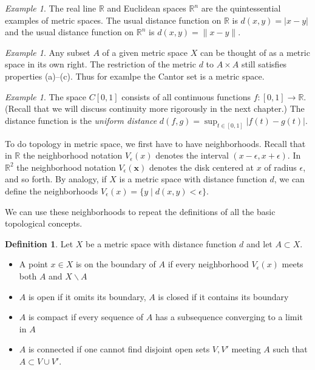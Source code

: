 \documentclass[11pt,oneside]{amsbook}
\newcommand{\RR}{\mathbb R}
\renewcommand{\setminus}{\smallsetminus}
\theoremstyle{definition}
\theoremstyle{plain}
\theoremstyle{definition}
\newtheorem{defn}[thm]{Definition}
\theoremstyle{remark}
\newtheorem{example}[thm]{Example}
\numberwithin{equation}{section}
\numberwithin{figure}{section}
\begin{document}
\begin{example}
  The real line $\RR$ and Euclidean spaces $\RR^n$ are the quintessential examples of metric spaces. The usual distance function on $\RR$ is $d(x,y)=|x-y|$ and the usual distance function on $\RR^n$ is $d(x,y)=\|x-y\|$.
\end{example}

\begin{example}
  Any subset $A$ of a given metric space $X$ can be thought of as a metric space in its own right. The restriction of the metric $d$ to $A\times A$ still satisfies properties (a)--(c). Thus for examlpe the Cantor set is a metric space.
\end{example}

\begin{example}
  The space $C[0,1]$ consists of all continuous functions $f\colon[0,1]\to\RR$. (Recall that we will discuss continuity more rigorously in the next chapter.) The distance function is the \emph{uniform distance} $d(f,g)=\sup_{t\in[0,1]}|f(t)-g(t)|$.
\end{example}

To do topology in metric space, we first have to have neighborhoods. Recall that in $\RR$ the neighborhood notation $V_\epsilon(x)$ denotes the interval $(x-\epsilon,x+\epsilon)$. In $\RR^2$ the neighborhood notation $V_\epsilon(\mathbf{x})$ denotes the disk centered at $x$ of radius $\epsilon$, and so forth. By analogy, if $X$ is a metric space with distance function $d$, we can define the neighborhoods $V_\epsilon(x)=\{y\mid d(x,y)<\epsilon\}$.

We can use these neighborhoods to repeat the definitions of all the basic topological concepts.

\begin{defn}
  Let $X$ be a metric space with distance function $d$ and let $A\subset X$.
  \begin{itemize}
  \item A point $x\in X$ is on the boundary of $A$ if every neighborhood $V_\epsilon(x)$ meets both $A$ and $X\setminus A$
  \item $A$ is open if it omits its boundary, $A$ is closed if it contains its boundary
  \item $A$ is compact if every sequence of $A$ has a subsequence converging to a limit in $A$
  \item $A$ is connected if one cannot find disjoint open sets $V,V'$ meeting $A$ such that $A\subset V\cup V'$.
  \end{itemize}
\end{defn}
\end{document}
